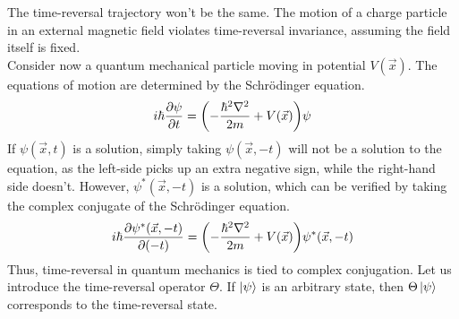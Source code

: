 \documentclass[12pt,a4paper,titlepage]{article}
\begin{document}
\begin{center}
\end{center}
The time-reversal trajectory won't be the same. The motion of a charge particle in an external magnetic field violates time-reversal invariance, assuming the field itself is fixed.\\

Consider now a quantum mechanical particle moving in potential $V(\vec{x})$. The equations of motion are determined by the Schr\"{o}dinger equation.
\begin{equation}
i\hbar\pdv{\psi}{t}=\qty(-\frac{\hbar^{2}\nabla^{2}}{2m}+V(\vec{x}))\psi
\end{equation}
If $\psi(\vec{x},t)$ is a solution, simply taking $\psi(\vec{x},-t)$ will not be a solution to the equation, as the left-side picks up an extra negative sign, while the right-hand side doesn't. However, $\psi^{*}(\vec{x},-t)$ is a solution, which can be verified by taking the complex conjugate of the Schr\"{o}dinger equation.
\begin{equation}
i\hbar\pdv{\psi^{*}(\vec{x},-t)}{(-t)}=\qty(-\frac{\hbar^{2}\nabla^{2}}{2m}+V(\vec{x}))\psi^{*}(\vec{x},-t)
\end{equation}
Thus, time-reversal in quantum mechanics is tied to complex conjugation. Let us introduce the time-reversal operator $\Theta$. If $\ket{\psi}$ is an arbitrary state, then $\Theta\ket{\psi}$ corresponds to the time-reversal state.\\
\end{document}
